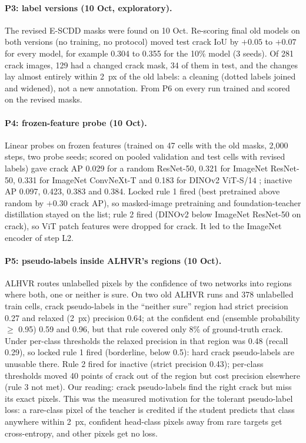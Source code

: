 \paragraph{P3: label versions (10 Oct, exploratory).} The revised E-SCDD masks were found on 10 Oct. Re-scoring final old models on
both versions (no training, no protocol) moved test crack IoU by $+0.05$ to $+0.07$ for every model, for example 0.304 to 0.355
for the 10\% model (3 seeds). Of 281 crack images, 129 had a changed crack mask, 34 of them in test, and the changes lay almost
entirely within 2~px of the old labels: a cleaning (dotted labels joined and widened), not a new annotation. From P6 on every run
trained and scored on the revised masks.

\paragraph{P4: frozen-feature probe (10 Oct).} Linear probes on frozen features (trained on 47 cells with the old masks, 2,000 steps,
two probe seeds; scored on pooled validation and test cells with revised labels) gave crack AP 0.029 for a random ResNet-50, 0.321 for ImageNet ResNet-50, 0.331 for
ImageNet ConvNeXt-T and 0.183 for DINOv2 ViT-S/14 \citep{oquab2023dinov2}; inactive AP 0.097, 0.423, 0.383 and 0.384.
Locked rule 1 fired (best pretrained above random by $+0.30$ crack AP), so masked-image pretraining and foundation-teacher
distillation stayed on the list; rule 2 fired (DINOv2 below ImageNet ResNet-50 on crack), so ViT patch features were dropped for
crack. It led to the ImageNet encoder of step L2.

\paragraph{P5: pseudo-labels inside ALHVR's regions (10 Oct).} ALHVR \citep{lei2025alhvr} routes unlabelled pixels by the
confidence of two networks into regions where both, one or neither is sure. On two old ALHVR runs and 378 unlabelled train cells,
crack pseudo-labels in the ``neither sure'' region had strict precision 0.27 and relaxed (2~px) precision 0.64; at the confident end
(ensemble probability $\geq$ 0.95) 0.59 and 0.96, but that rule covered only 8\% of ground-truth crack. Under per-class thresholds the
relaxed precision in that region was 0.48 (recall 0.29), so locked rule 1 fired (borderline, below 0.5): hard crack pseudo-labels
are unusable there. Rule 2 fired for inactive (strict precision 0.43); per-class thresholds moved 40 points of crack out of the
region but cost precision elsewhere (rule 3 not met). Our reading: crack pseudo-labels find the right crack but miss its exact
pixels. This was the measured motivation for the tolerant pseudo-label loss: a rare-class pixel of the teacher is credited if the
student predicts that class anywhere within 2~px, confident head-class pixels away from rare targets get cross-entropy, and other
pixels get no loss.

